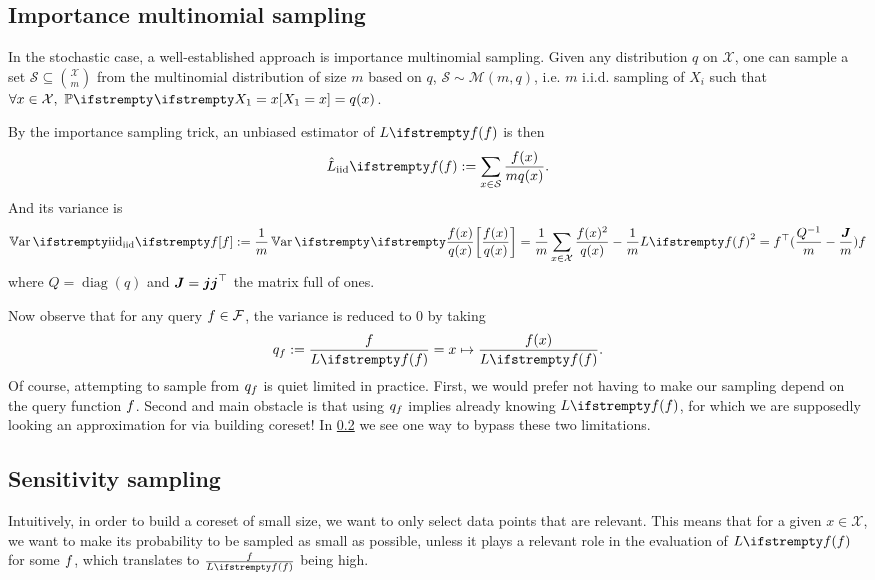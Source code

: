 \subsection{Importance multinomial sampling}

In the stochastic case, a well-established approach is importance multinomial sampling. Given any distribution $q$ on $\mathcal{X}$, one can sample a set $\mathcal{S} \subseteq \binom{\mathcal{X}}{m}$ from the multinomial distribution of size $m$ based on $q$, $\mathcal S \sim \mathcal M(m, q)$, i.e. $m$ i.i.d. sampling of $X_i$ such that $\forall x \in \mathcal{X},\ \PP{}{X_1=x} = q(x)$.

By the importance sampling trick, an unbiased estimator of $\loss{\query}$ is then
\begin{equation*}
	\estloss{\textrm{iid}}{\query} := \sum_{x\in \mathcal S} \frac{\query(x)}{m q(x)}.
\end{equation*}
And its variance is
\begin{equation}
	\Var{\textrm{iid}}{\query} :=\frac{1}{m} \Var{}{\frac {\query(x)} {q(x)}}
	=\frac{1}{m} \sum_{x \in \mathcal{X}} \frac{\query(x)^{2}}{q(x)} -\frac{1}{m} \loss{\query}^{2} = \query\T(\frac{Q^{-1}} m - \frac{\moones} m)\query
\end{equation}
where $Q = \operatorname{diag}(q)$ and $\boldsymbol{J} = \boldsymbol{j} \boldsymbol{j} ^\top$ the matrix full of ones. 


Now observe that for any query $f \in \mathcal{F}$, the variance is reduced to 0 by taking
\begin{equation*}
    q_{\query} :=\frac{ \query}{\loss{\query}} = x \mapsto \frac{ \query(x)}{\loss{\query}}.
\end{equation*}
Of course, attempting to sample from $q_f$ is quiet limited in practice. First, we would prefer not having to make our sampling depend on the query function $f$. Second and main obstacle is that using $q_f$ implies already knowing $\loss{\query}$, for which we are supposedly looking an approximation for via building coreset! In \cref{sect_senstsampl} we see one way to bypass these two limitations.

\subsection{Sensitivity sampling}
\label{sect_senstsampl}



Intuitively, in order to build a coreset of small size, we want to only select data points that are relevant. This means that for a given $x \in \mathcal{X}$, we want to make its probability to be sampled as small as possible, unless it plays a relevant role in the evaluation of $\loss{\query}$ for some $f$, which translates to $\frac{\query}{\loss{\query}}$ being high.

